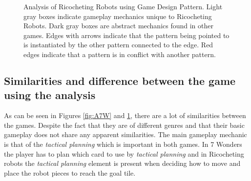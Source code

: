 \documentclass[a4paper]{article}
\begin{document}
\begin{figure}[htb]

  \caption{Analysis of Ricocheting Robots using Game Design Pattern. Light gray boxes indicate gameplay mechanics unique to Ricocheting Robots. Dark gray boxes are abstract mechanics found in other games. Edges with arrows indicate that the pattern being pointed to is instantiated by the other pattern connected to the edge. Red edges indicate that a pattern is in conflict with another pattern.} 
  \label{fig:RRW}
\end{figure}


\subsection{Similarities and difference between the game using the analysis}
  As can be seen in Figures \ref{fig:A7W} and \ref{fig:RRW}, there are a lot of similarities between the games. 
  Despite the fact that they are of different genres and that their basic gameplay does not share any apparent similarities. 
  The main gameplay mechanic is that of the \textit{tactical planning} which is important in both games. 
  In 7 Wonders the player has to plan which card to use by \textit{tactical planning} and in Ricocheting robots the \textit{tactical planning} element is present when deciding how to move and place the robot pieces to reach the goal tile. 
\end{document}
